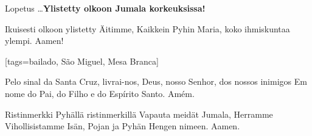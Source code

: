 \begin{songs}{}
\begin{passage}[FI]{Lopetus}
          \ldots\textbf{Ylistetty olkoon Jumala korkeuksissa!}
          \par
          Ikuisesti olkoon ylistetty Äitimme, Kaikkein Pyhin Maria,
          koko ihmiskuntaa ylempi. Aamen!
        \end{passage}
      \endsong
      [tags={bailado, São Miguel, Mesa Branca}]
        \begin{passage}[PT]{}\obeylines
          Pelo sinal da Santa Cruz,
          livrai-nos, Deus, nosso Senhor,
          dos nossos inimigos
          \polpar
          Em nome do Pai, do Filho e do Espírito Santo.
          \polpar
          Amém.
        \end{passage}
        \begin{passage}[FI]{Ristinmerkki}\obeylines
          Pyhällä ristinmerkillä
          Vapauta meidät Jumala, Herramme
          Vihollisistamme
          \polpar
          Isän, Pojan ja Pyhän Hengen nimeen.
          \polpar
          Aamen.
        \end{passage}

\end{songs}
